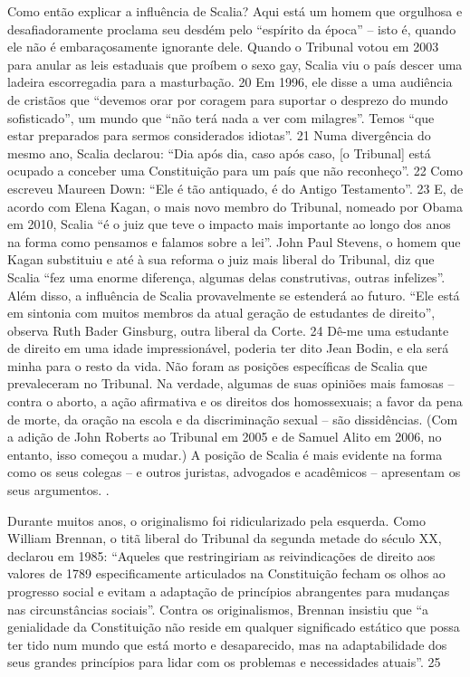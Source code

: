 Como então explicar a influência de Scalia? Aqui está um homem que orgulhosa e desafiadoramente proclama seu desdém pelo “espírito da época” – isto é, quando ele não é embaraçosamente ignorante dele. Quando o Tribunal votou em 2003 para anular as leis estaduais que proíbem o sexo gay, Scalia viu o país descer uma ladeira escorregadia para a masturbação.
 {\color{blue} 20}  
Em 1996, ele disse a uma audiência de cristãos que “devemos orar por coragem para suportar o desprezo do mundo sofisticado”, um mundo que “não terá nada a ver com milagres”. Temos “que estar preparados para sermos considerados idiotas”.
 {\color{blue} 21}  
Numa divergência do mesmo ano, Scalia declarou: “Dia após dia, caso após caso, [o Tribunal] está ocupado a conceber uma Constituição para um país que não reconheço”.
 {\color{blue} 22}  
Como escreveu Maureen Down: “Ele é tão antiquado, é do Antigo Testamento”.
 {\color{blue} 23}  
E, de acordo com Elena Kagan, o mais novo membro do Tribunal, nomeado por Obama em 2010, Scalia “é o juiz que teve o impacto mais importante ao longo dos anos na forma como pensamos e falamos sobre a lei”. John Paul Stevens, o homem que Kagan substituiu e até à sua reforma o juiz mais liberal do Tribunal, diz que Scalia “fez uma enorme diferença, algumas delas construtivas, outras infelizes”. Além disso, a influência de Scalia provavelmente se estenderá ao futuro. “Ele está em sintonia com muitos membros da atual geração de estudantes de direito”, observa Ruth Bader Ginsburg, outra liberal da Corte.
 {\color{blue} 24}  
Dê-me uma estudante de direito em uma idade impressionável, poderia ter dito Jean Bodin, e ela será minha para o resto da vida. Não foram as posições específicas de Scalia que prevaleceram no Tribunal. Na verdade, algumas de suas opiniões mais famosas – contra o aborto, a ação afirmativa e os direitos dos homossexuais; a favor da pena de morte, da oração na escola e da discriminação sexual – são dissidências. (Com a adição de John Roberts ao Tribunal em 2005 e de Samuel Alito em 2006, no entanto, isso começou a mudar.) A posição de Scalia é mais evidente na forma como os seus colegas – e outros juristas, advogados e acadêmicos – apresentam os seus argumentos. .
 
\par
 
Durante muitos anos, o originalismo foi ridicularizado pela esquerda. Como William Brennan, o titã liberal do Tribunal da segunda metade do século XX, declarou em 1985: “Aqueles que restringiriam as reivindicações de direito aos valores de 1789 especificamente articulados na Constituição fecham os olhos ao progresso social e evitam a adaptação de princípios abrangentes para mudanças nas circunstâncias sociais”. Contra os originalismos, Brennan insistiu que “a genialidade da Constituição não reside em qualquer significado estático que possa ter tido num mundo que está morto e desaparecido, mas na adaptabilidade dos seus grandes princípios para lidar com os problemas e necessidades atuais”.
 {\color{blue} 25}  

